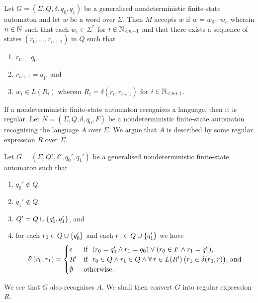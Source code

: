Let \(G = (\Sigma, Q, \delta, q_0, q_1)\) be a generalised nondeterministic
finite-state automaton and let \(w\) be a word over \(\Sigma\). Then \(M\)
accepts \(w\) if \(w = w_0 \cdots w_n\) wherein \(n \in \setnat\) such that each
\(w_i \in \Sigma^*\) for \(i \in \Nln[n + 1]\) and that there exists a sequence
of states \((r_0, \ldots, r_{n + 1})\) in \(Q\) such that
\begin{enumerate}
    \item \(r_0 = q_0\),
    \item \(r_{n + 1} = q_1\), and
    \item \(w_i \in L(R_i)\) wherein \(R_i = \delta(r_i, r_{i + 1})\) for \(i
    \in \Nln[n + 1]\).
\end{enumerate}

\Blm
    \label{lem2}
    If a nondeterministic finite-state automaton recognises a language, then it
    is regular.
\Elm
\Bpr
    Let \(N = (\Sigma, Q, \delta, q_0, F)\) be a nondeterministic finite-state
    automaton recognising the language \(A\) over \(\Sigma\). We argue that
    \(A\) is described by some regular expression \(R\) over \(\Sigma\).

    Let \(G = (\Sigma, Q', \delta', q_0', q_1')\) be a generalised
    nondeterministic finite-state automaton such that
    \begin{enumerate}
        \item \(q_0' \not\in Q\),
        \item \(q_1' \not\in Q\),
        \item \(Q' = Q \cup \set{q_0', q_1'}\), and
        \item for each \(r_0 \in Q \cup \set{q_0'}\) and each \(r_1 \in Q \cup
        \set{q_1'}\) we have
            \[
                \delta'(r_0, r_1) = \begin{cases}
                        \epsilon & \text{if }\ (r_0 = q_0' \land r_1 = q_0) \lor
                        (r_0 \in F \land r_1 = q_1'),\\
                        R' & \text{if }\ r_0 \in Q \land r_1 \in Q \land \forall
                        \, r \in L(R') \, \big(r_1 \in \delta(r_0, r)\big)
                        \text{, and}\\
                        \nset & \text{otherwise.}
                    \end{cases}
            \]
    \end{enumerate}
    We see that \(G\) also recognises \(A\). We shall then convert \(G\) into
    regular expression \(R\).

